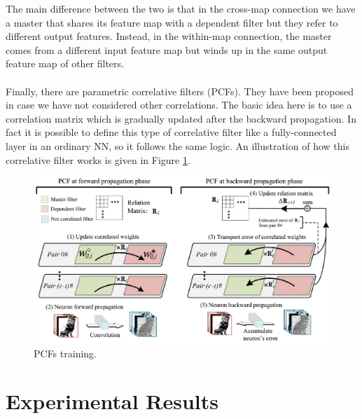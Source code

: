 \FloatBarrier

The main difference between the two is that in the cross-map connection we have a master that shares its feature map with a dependent filter but they refer to different output features. Instead, in the within-map connection, the master comes from a different input feature map but winds up in the same output feature map of other filters.\\ \\
Finally, there are parametric correlative filters (PCFs). They have been proposed in case we have not considered other correlations. The basic idea here is to use a correlation matrix which is gradually updated after the backward propagation. In fact it is possible to define this type of correlative filter like a fully-connected layer in an ordinary NN, so it follows the same logic. An illustration of how this correlative filter works is given in Figure \ref{fig:02_4}.\\

\begin{figure}[h!]
    \centering
    \includegraphics[scale=0.55]{images/02_4.png}
    \caption{PCFs training.}
    \label{fig:02_4}
\end{figure}

\FloatBarrier

\section{Experimental Results}

